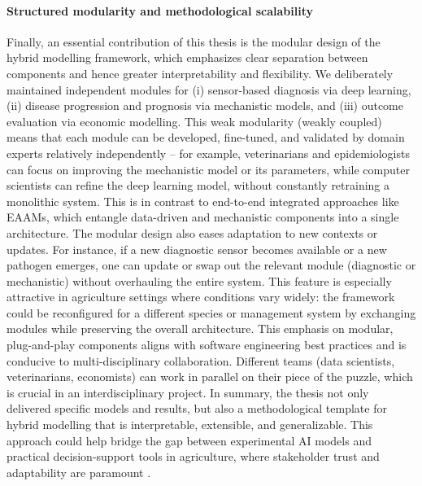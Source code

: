 \paragraph{Structured modularity and methodological scalability} Finally, an essential contribution of this thesis is the modular design of the hybrid modelling framework, which emphasizes clear separation between components and hence greater interpretability and flexibility. We deliberately maintained independent modules for (i) sensor-based diagnosis via deep learning, (ii) disease progression and prognosis via mechanistic models, and (iii) outcome evaluation via economic modelling. This weak modularity (weakly coupled) means that each module can be developed, fine-tuned, and validated by domain experts relatively independently – for example, veterinarians and epidemiologists can focus on improving the mechanistic model or its parameters, while computer scientists can refine the deep learning model, without constantly retraining a monolithic system. This is in contrast to end-to-end integrated approaches like EAAMs, which entangle data-driven and mechanistic components into a single architecture. The modular design also eases adaptation to new contexts or updates. For instance, if a new diagnostic sensor becomes available or a new pathogen emerges, one can update or swap out the relevant module (diagnostic or mechanistic) without overhauling the entire system. This feature is especially attractive in agriculture settings where conditions vary widely: the framework could be reconfigured for a different species or management system by exchanging modules while preserving the overall architecture. This emphasis on modular, plug-and-play components aligns with software engineering best practices and is conducive to multi-disciplinary collaboration. Different teams (data scientists, veterinarians, economists) can work in parallel on their piece of the puzzle, which is crucial in an interdisciplinary project. In summary, the thesis not only delivered specific models and results, but also a methodological template for hybrid modelling that is interpretable, extensible, and generalizable. This approach could help bridge the gap between experimental AI models and practical decision-support tools in agriculture, where stakeholder trust and adaptability are paramount \cite{wolfert2017big}.


